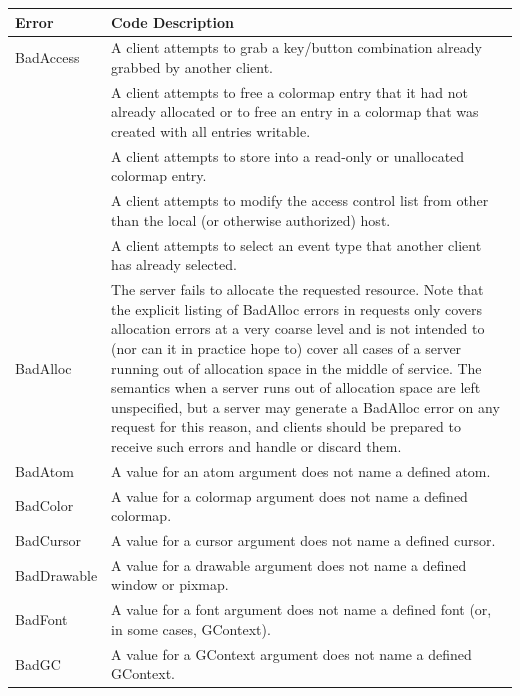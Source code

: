 \documentclass{report}
\begin{document}
\begin{itemize}
            \begin{center}
                \begin{tabularx}{\textwidth}{@{}lX@{}}
                    \toprule
                    \textbf{Error}& \textbf{Code Description} \\
                    \midrule
                    BadAccess &A client attempts to grab a key/button combination already grabbed by another client.\\[2ex]
                              &A client attempts to free a colormap entry that it had not already allocated or to free an entry in a colormap that was created with all entries writable.\\[2ex]
                              &A client attempts to store into a read-only or unallocated colormap entry.\\[2ex]
                              &A client attempts to modify the access control list from other than the local (or otherwise authorized) host.\\[2ex]
                              &A client attempts to select an event type that another client has already selected.\\[2ex]
                    BadAlloc &The server fails to allocate the requested resource. Note that the explicit listing of BadAlloc errors in requests only covers allocation errors at a very coarse level and is not intended to (nor can it in practice hope to) cover all cases of a server running out of allocation space in the middle of service. The semantics when a server runs out of allocation space are left unspecified, but a server may generate a BadAlloc error on any request for this reason, and clients should be prepared to receive such errors and handle or discard them.\\[2ex]
                    BadAtom &A value for an atom argument does not name a defined atom.\\[2ex]
                    BadColor &A value for a colormap argument does not name a defined colormap.\\[2ex]
                    BadCursor &A value for a cursor argument does not name a defined cursor.\\[2ex]
                    BadDrawable &A value for a drawable argument does not name a defined window or pixmap.\\[2ex]
                    BadFont &A value for a font argument does not name a defined font (or, in some cases, GContext). \\[2ex]
                    BadGC &A value for a GContext argument does not name a defined GContext. \\[2ex]

\end{tabularx}
\end{center}
\end{itemize}
\end{document}
